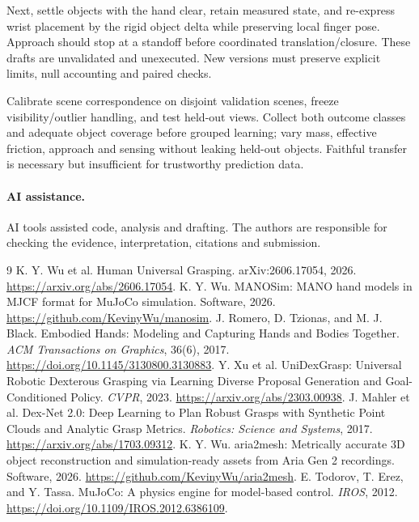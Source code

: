 Next, settle objects with the hand clear, retain measured state, and re-express wrist placement by the rigid object delta while preserving local finger pose. Approach should stop at a standoff before coordinated translation/closure. These drafts are unvalidated and unexecuted. New versions must preserve explicit limits, null accounting and paired checks.

Calibrate scene correspondence on disjoint validation scenes, freeze visibility/outlier handling, and test held-out views. Collect both outcome classes and adequate object coverage before grouped learning; vary mass, effective friction, approach and sensing without leaking held-out objects. Faithful transfer is necessary but insufficient for trustworthy prediction data.

\paragraph{AI assistance.} AI tools assisted code, analysis and drafting. The authors are responsible for checking the evidence, interpretation, citations and submission.

\clearpage
\begin{thebibliography}{9}
 K. Y. Wu et al. Human Universal Grasping. arXiv:2606.17054, 2026. \url{https://arxiv.org/abs/2606.17054}.
 K. Y. Wu. MANOSim: MANO hand models in MJCF format for MuJoCo simulation. Software, 2026. \url{https://github.com/KevinyWu/manosim}.
 J. Romero, D. Tzionas, and M. J. Black. Embodied Hands: Modeling and Capturing Hands and Bodies Together. \emph{ACM Transactions on Graphics}, 36(6), 2017. \url{https://doi.org/10.1145/3130800.3130883}.
 Y. Xu et al. UniDexGrasp: Universal Robotic Dexterous Grasping via Learning Diverse Proposal Generation and Goal-Conditioned Policy. \emph{CVPR}, 2023. \url{https://arxiv.org/abs/2303.00938}.
 J. Mahler et al. Dex-Net 2.0: Deep Learning to Plan Robust Grasps with Synthetic Point Clouds and Analytic Grasp Metrics. \emph{Robotics: Science and Systems}, 2017. \url{https://arxiv.org/abs/1703.09312}.
 K. Y. Wu. aria2mesh: Metrically accurate 3D object reconstruction and simulation-ready assets from Aria Gen 2 recordings. Software, 2026. \url{https://github.com/KevinyWu/aria2mesh}.
 E. Todorov, T. Erez, and Y. Tassa. MuJoCo: A physics engine for model-based control. \emph{IROS}, 2012. \url{https://doi.org/10.1109/IROS.2012.6386109}.
\end{thebibliography}

